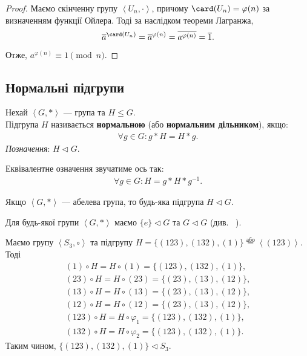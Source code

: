 \documentclass{math_library}
\begin{document}
\begin{proof}
Маємо скінченну групу $\left<U_n,\cdot\right>$, причому $\card(U_n) = \varphi(n)$ за визначенням функції Ойлера. Тоді за наслідком теореми Лагранжа, 
\[
\overline{a}^{\card(U_n)} = \overline{a}^{\varphi(n)} = \overline{a^{\varphi(n)}} = \overline{1}.
\]
Отже, $a^{\varphi(n)} \equiv 1 \pmod n$.
\end{proof}

\subsection{Нормальні підгрупи}
\begin{definition}
Нехай $\left<G,* \right>$ --- група та $H \leq G$.\\
Підгрупа $H$ називається \textbf{нормальною} (або \textbf{нормальним дільником}), якщо:
\begin{align*}
\forall g \in G: g*H = H*g.
\end{align*}
\textit{Позначення}: $H \triangleleft G$.
\end{definition}

\begin{remark}
Еквівалентне означення звучатиме ось так:
\begin{align*}
\forall g \in G: H = g*H*g^{-1}.
\end{align*}
\end{remark}

\begin{example}
Якщо $\left<G,* \right>$ --- абелева група, то будь-яка підгрупа $H \triangleleft G$.
\end{example}

\begin{example}
Для будь-якої групи $\left<G,*\right>$ маємо $\{e\} \triangleleft G$ та $G \triangleleft G$ (див.~ ).
\end{example}

\begin{example}
Маємо групу $\left<S_3, \circ \right>$ та підгрупу $H = \{(123),(132),(1)\} \overset{\text{або}}{=} \left<(123)\right>$. Тоді
\begin{align*}
(1) \circ H = H \circ (1) = \{(123),(132),(1)\}, \\
(23) \circ H = H \circ (23) = \{(23),(13),(12)\}, \\
(13) \circ H = H \circ (13) = \{(23),(13),(12)\}, \\
(12) \circ H = H \circ (12) = \{(23),(13),(12)\}, \\
(123) \circ H = H \circ \varphi_1 = \{(123),(132),(1)\}, \\
(132) \circ H = H \circ \varphi_2 = \{(123),(132),(1)\}.
\end{align*}
Таким чином, $\{(123),(132),(1)\} \triangleleft S_3$.
\end{example}
\end{document}
